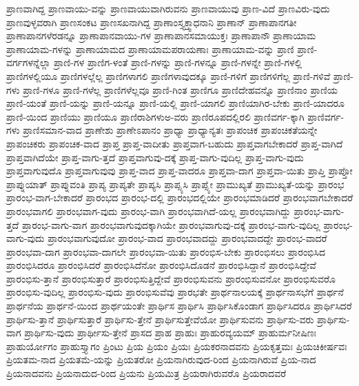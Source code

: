 {ಪ್ರಾಣವಾಗಿದ್ದ
ಪ್ರಾಣವಾಯು-ವನ್ನು
ಪ್ರಾಣವಾಯುವಾಗಿರುವನು
ಪ್ರಾಣವಾಯುವು
ಪ್ರಾಣ-ವಿದೆ
ಪ್ರಾಣವಿರು-ವುದು
ಪ್ರಾಣವುಳ್ಳವರಾಗಿ
ಪ್ರಾಣಸಂಕಟ
ಪ್ರಾಣಸಖನಾಗಿದ್ದ
ಪ್ರಾಣಾಂಸ್ತ್ಯಕ್ತ್ವಾಧನಾನಿ
ಪ್ರಾಣಾನ್
ಪ್ರಾಣಾಪಾನಗತೀ
ಪ್ರಾಣಾಪಾನಗಳೆರಡನ್ನೂ
ಪ್ರಾಣಾಪಾನವಾಯು-ಗಳ
ಪ್ರಾಣಾಪಾನಸಮಾಯುಕ್ತಃ
ಪ್ರಾಣಾಪಾನೌ
ಪ್ರಾಣಾಯಾಮ
ಪ್ರಾಣಾಯಾಮ-ಗಳನ್ನು
ಪ್ರಾಣಾಯಾಮದ
ಪ್ರಾಣಾಯಾಮಪರಾಯಣಾಃ
ಪ್ರಾಣಾಯಾಮ-ವನ್ನು
ಪ್ರಾಣಿ
ಪ್ರಾಣಿ-ವರ್ಗಗಳನ್ನೆಲ್ಲಾ
ಪ್ರಾಣಿ-ಗಳ
ಪ್ರಾಣಿಗ-ಳಂತೆ
ಪ್ರಾಣಿ-ಗಳನ್ನು
ಪ್ರಾಣಿ-ಗಳನ್ನೂ
ಪ್ರಾಣಿ-ಗಳನ್ನೇ
ಪ್ರಾಣಿ-ಗಳಲ್ಲಿ
ಪ್ರಾಣಿಗಳಲ್ಲಿಯೂ
ಪ್ರಾಣಿಗಳಲ್ಲೆಲ್ಲ
ಪ್ರಾಣಿಗಳಾಗಲಿ
ಪ್ರಾಣಿಗಳಾವುದಕ್ಕೂ
ಪ್ರಾಣಿ-ಗಳಿಗೆ
ಪ್ರಾಣಿಗಳಿಗೆಲ್ಲ
ಪ್ರಾಣಿ-ಗಳಿವೆ
ಪ್ರಾಣಿ-ಗಳು
ಪ್ರಾಣಿ-ಗಳೂ
ಪ್ರಾಣಿ-ಗಳೆಲ್ಲ
ಪ್ರಾಣಿಗಳೆಲ್ಲವೂ
ಪ್ರಾಣಿ-ಗಿಂತ
ಪ್ರಾಣಿಗೂ
ಪ್ರಾಣಿದೇಹವನ್ನೊ
ಪ್ರಾಣಿನಾಂ
ಪ್ರಾಣಿಯ
ಪ್ರಾಣಿ-ಯಂತೆ
ಪ್ರಾಣಿ-ಯನ್ನು
ಪ್ರಾಣಿ-ಯನ್ನೂ
ಪ್ರಾಣಿ-ಯಲ್ಲಿ
ಪ್ರಾಣಿ-ಯಾಗಲಿ
ಪ್ರಾಣಿಯಾಗಿರ-ಬೇಕು
ಪ್ರಾಣಿ-ಯಾದರೂ
ಪ್ರಾಣಿ-ಯಿಂದ
ಪ್ರಾಣಿಯು
ಪ್ರಾಣಿಯೂ
ಪ್ರಾಣಿರಾಶಿಗಳುಅ-ವರು
ಪ್ರಾಣಿರೂಪದಲ್ಲಿರಲಿ
ಪ್ರಾಣಿವರ್ಗ-ಕ್ಕಾಗಿ
ಪ್ರಾಣಿವರ್ಗ-ಗಳು
ಪ್ರಾಣಿಸಮಾನ-ವಾದ
ಪ್ರಾಣೇಶು
ಪ್ರಾಣೇಽಪಾನಂ
ಪ್ರಾಧ್ಯಾ
ಪ್ರಾಧ್ಯಾನ್ಯತಃ
ಪ್ರಾಪಂಚಿಕ
ಪ್ರಾಪಂಚಿಕತೆಯನ್ನೇ
ಪ್ರಾಪಂಚಿಕರು
ಪ್ರಾಪಂಚಿಕ-ವಾದ
ಪ್ರಾಪ್ತ
ಪ್ರಾಪ್ತ-ವಾದೀತು
ಪ್ರಾಪ್ತವಾಗ-ಬಹುದು
ಪ್ರಾಪ್ತವಾಗಬೇಕಾದರೆ
ಪ್ರಾಪ್ತ-ವಾಗಿದೆ
ಪ್ರಾಪ್ತವಾಗಿದೆಯೇ
ಪ್ರಾಪ್ತ-ವಾಗು-ತ್ತದೆ
ಪ್ರಾಪ್ತವಾಗುವು-ದಕ್ಕೆ
ಪ್ರಾಪ್ತ-ವಾಗು-ವುದಿಲ್ಲ
ಪ್ರಾಪ್ತ-ವಾಗು-ವುದು
ಪ್ರಾಪ್ತವಾಗುವುದೊ
ಪ್ರಾಪ್ತವಾಗುವುವು
ಪ್ರಾಪ್ತ-ವಾದ
ಪ್ರಾಪ್ತ-ವಾದರೂ
ಪ್ರಾಪ್ತವಾ-ದಾಗ
ಪ್ರಾಪ್ತವಾ-ಯಿತು
ಪ್ರಾಪ್ತಿ
ಪ್ರಾಪ್ತೋ
ಪ್ರಾಪ್ನುಯಾತ್
ಪ್ರಾಪ್ನುವಂತಿ
ಪ್ರಾಪ್ಯ
ಪ್ರಾಪ್ಯತೇ
ಪ್ರಾಪ್ಯಸಿ
ಪ್ರಾಪ್ಸ್ಯಸಿ
ಪ್ರಾಪ್ಸ್ಯೇ
ಪ್ರಾಮುಖ್ಯತೆ
ಪ್ರಾಮುಖ್ಯತೆ-ಯನ್ನು
ಪ್ರಾರಂಭ
ಪ್ರಾರಂಭ-ವಾಗ-ಬೇಕಾದರೆ
ಪ್ರಾರಂಭದ
ಪ್ರಾರಂಭ-ದಲ್ಲಿ
ಪ್ರಾರಂಭದಲ್ಲಿಯೇ
ಪ್ರಾರಂಭಮಾಡಿದರೆ
ಪ್ರಾರಂಭವಾಗಬೇಕಾದರೆ
ಪ್ರಾರಂಭವಾಗಲಿ
ಪ್ರಾರಂಭವಾಗ-ವುದು
ಪ್ರಾರಂಭ-ವಾಗಿ
ಪ್ರಾರಂಭವಾಗಿದೆ-ಯಲ್ಲ
ಪ್ರಾರಂಭವಾಗಿದ್ದು
ಪ್ರಾರಂಭ-ವಾಗು-ತ್ತದೆ
ಪ್ರಾರಂಭ-ವಾಗು-ವಾಗ
ಪ್ರಾರಂಭವಾಗುವುದಕ್ಕಾಗಿಯೇ
ಪ್ರಾರಂಭವಾಗುವು-ದಕ್ಕೆ
ಪ್ರಾರಂಭ-ವಾಗು-ವುದಿಲ್ಲ
ಪ್ರಾರಂಭ-ವಾಗು-ವುದು
ಪ್ರಾರಂಭವಾಗುವುದೋ
ಪ್ರಾರಂಭ-ವಾದ
ಪ್ರಾರಂಭವಾದದ್ದು
ಪ್ರಾರಂಭವಾದದ್ದೇ
ಪ್ರಾರಂಭ-ವಾದರೆ
ಪ್ರಾರಂಭವಾ-ದಾಗ
ಪ್ರಾರಂಭವಾ-ದಾಗಲೇ
ಪ್ರಾರಂಭವಾ-ಯಿತು
ಪ್ರಾರಂಭಿಸ-ಬೇಕು
ಪ್ರಾರಂಭಿಸಲು
ಪ್ರಾರಂಭಿಸಿದ
ಪ್ರಾರಂಭಿಸಿದರೂ
ಪ್ರಾರಂಭಿಸಿದರೆ
ಪ್ರಾರಂಭಿಸಿದೆನೋ
ಪ್ರಾರಂಭಿಸಿದೊಡನೆ
ಪ್ರಾರಂಭಿಸಿದ್ದಾನೆ
ಪ್ರಾರಂಭಿಸಿದ್ದೇವೆ
ಪ್ರಾರಂಭಿಸು-ತ್ತಾನೆ
ಪ್ರಾರಂಭಿಸುತ್ತಾರೆ
ಪ್ರಾರಂಭಿಸುತ್ತಿದ್ದೇವೆ
ಪ್ರಾರಂಭಿಸುವನು
ಪ್ರಾರಂಭಿಸುವನೋ
ಪ್ರಾರಂಭಿಸುವರೊ
ಪ್ರಾರಂಭಿಸು-ವುದಿಲ್ಲ
ಪ್ರಾರಂಭಿಸು-ವುದು
ಪ್ರಾರಂಭಿಸುವೆವು
ಪ್ರಾರಭತೇ
ಪ್ರಾರ್ಥನಾಲಯಕ್ಕೆ
ಪ್ರಾರ್ಥನಾಸಭೆಗೆ
ಪ್ರಾರ್ಥನೆ
ಪ್ರಾರ್ಥನೆಯ
ಪ್ರಾರ್ಥನೆ-ಯಿಂದ
ಪ್ರಾರ್ಥಯಂತೇ
ಪ್ರಾರ್ಥಿಸ
ಪ್ರಾರ್ಥಿಸಿ
ಪ್ರಾರ್ಥಿಸಿಕೊಂಡಾಗ
ಪ್ರಾರ್ಥಿಸಿದರೂ
ಪ್ರಾರ್ಥಿಸಿದರೆ
ಪ್ರಾರ್ಥಿಸು-ತ್ತಾನೆ
ಪ್ರಾರ್ಥಿಸುತ್ತಾರೆ
ಪ್ರಾರ್ಥಿಸು-ತ್ತೇನೆ
ಪ್ರಾರ್ಥಿಸುತ್ತೇವೆಯೋ
ಪ್ರಾರ್ಥಿಸುವನು
ಪ್ರಾರ್ಥಿಸು-ವರು
ಪ್ರಾರ್ಥಿಸು-ವಾಗ
ಪ್ರಾರ್ಥಿಸು-ವುದು
ಪ್ರಾರ್ಥೀಸು-ತ್ತೇನೆ
ಪ್ರಾಸದ
ಪ್ರಾಹ
ಪ್ರಾಹುಃ
ಪ್ರಾಹುರವ್ಯಯಮ್
ಪ್ರಾಹುರ್ಮನೀಷಿಣಃ
ಪ್ರಾಹುರ್ಯೋಗಂ
ಪ್ರಾಹುಸ್ತ್ಯಾಗಂ
ಪ್ರಿಂಟು
ಪ್ರಿಯ
ಪ್ರಿಯಂ
ಪ್ರಿಯಃ
ಪ್ರಿಯಕರನಾದವನು
ಪ್ರಿಯಕೃತ್ತಮಃ
ಪ್ರಿಯಚಿಕೀರ್ಷವಃ
ಪ್ರಿಯತಮ-ನಾದ
ಪ್ರಿಯತಮೆ-ಯನ್ನು
ಪ್ರಿಯತರೋ
ಪ್ರಿಯನಾಗಿರುವುದ-ರಿಂದ
ಪ್ರಿಯನಾಗಿರುವೆ
ಪ್ರಿಯ-ನಾದ
ಪ್ರಿಯನಾದವನು
ಪ್ರಿಯನಾದುದ-ರಿಂದ
ಪ್ರಿಯನು
ಪ್ರಿಯಮಿತ್ರ
ಪ್ರಿಯರಾಗಿರುವರೊ
ಪ್ರಿಯರಾದವರೆ
}
